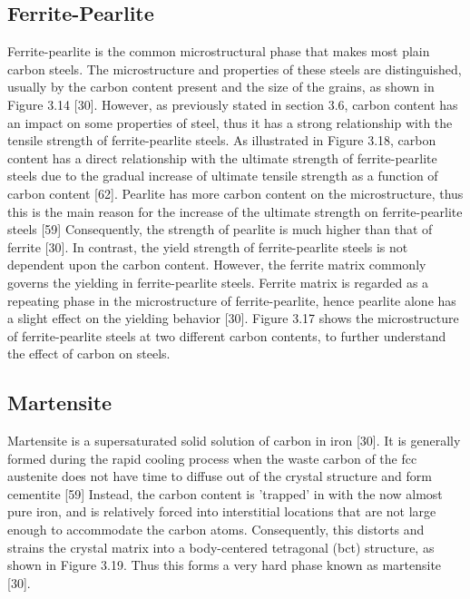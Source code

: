\documentclass[12pt]{report}
\begin{document}
\subsection{Ferrite-Pearlite}
Ferrite-pearlite is the common microstructural phase that makes most plain carbon steels. The microstructure and properties of these steels are distinguished, usually by the carbon content present and the size of the grains, as shown in Figure 3.14 [30]. However, as previously stated in section 3.6, carbon content has an impact on some properties of steel, thus it has a strong relationship with the tensile strength of ferrite-pearlite steels. As illustrated in Figure 3.18, carbon content has a direct relationship with the ultimate strength of ferrite-pearlite steels due to the gradual increase of ultimate tensile strength as a function of carbon content [62]. 
Pearlite has more carbon content on the microstructure, thus this is the main reason for the increase of the ultimate strength on ferrite-pearlite steels [59] Consequently, the strength of pearlite is much higher than that of ferrite [30]. In contrast, the yield strength of ferrite-pearlite steels is not dependent upon the carbon content. However, the ferrite matrix commonly governs the yielding in ferrite-pearlite steels. Ferrite matrix is regarded as a repeating phase in the microstructure of ferrite-pearlite, hence pearlite alone has a slight effect on the yielding behavior [30]. Figure 3.17 shows the microstructure of ferrite-pearlite steels at two different carbon contents, to further understand the effect of carbon on steels.

 

\subsection{Martensite}
Martensite is a supersaturated solid solution of carbon in iron [30]. It is generally formed during the rapid cooling process when the waste carbon of the fcc austenite does not have time to diffuse out of the crystal structure and form cementite [59] Instead, the carbon content is 'trapped' in with the now almost pure iron, and is relatively forced into interstitial locations that are not large enough to accommodate the carbon atoms. Consequently, this distorts and strains the crystal matrix into a body-centered tetragonal (bct) structure, as shown in Figure 3.19. Thus this forms a very hard phase known as martensite [30].
 
\end{document}
